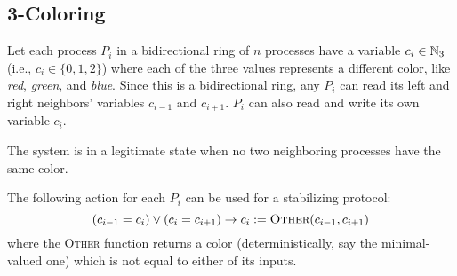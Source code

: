 \subsection{3-Coloring}


Let each process $P_i$ in a bidirectional ring of $n$ processes have a variable $c_i\in \mathbb{N}_3$ (i.e., $c_i\in \{0,1,2\}$) where each of the three values represents a different color, like {\it red}, {\it green}, and {\it blue}.
Since this is a bidirectional ring, any $P_i$ can read its left and right neighbors' variables $c_{i-1}$ and $c_{i+1}$.
$P_i$ can also read and write its own variable $c_i$.

The system is in a legitimate state when no two neighboring processes have the same color.

The following action for each $P_i$ can be used for a stabilizing protocol:
\[
 (c_{i-1} = c_i) \vee (c_i = c_{i+1}) \to c_i := \textsc{Other}(c_{i-1}, c_{i+1})
\]
where the \textsc{Other} function returns a color (deterministically, say the minimal-valued one) which is not equal to either of its inputs.

